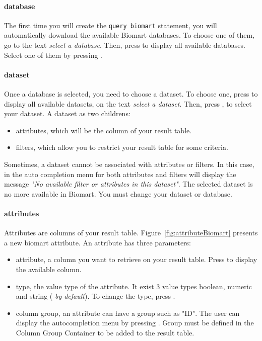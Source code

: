 \paragraph{database}
The first time you will create the \texttt{query biomart} statement, you will automatically download the available Biomart databases. To choose one of them, go to the text \textit{select a database}. Then, press \keys{\ctrl+\space} to display all available databases. Select one of them by pressing \keys{\return}. 

 
\paragraph{dataset} %
Once a database is selected, you need to choose a dataset. To choose one, press \keys{\ctrl+\space} to display all available datasets, on the text \textit{select a dataset}. Then, press \keys{\return}, to select your dataset. \newline
A dataset as two childrens:
\begin{itemize}
\item attributes, which will be the column of your result table.
\item filters, which allow you to restrict your result table for some criteria.
\end{itemize}
\begin{remark}
Sometimes, a dataset cannot be associated with attributes or filters. In this case, in the auto completion menu for both attributes and filters will display the message \textit{"No available filter or attributes in this dataset"}. The selected dataset is no more available in Biomart. You must change your dataset or database. 
\end{remark}

\paragraph{attributes}
Attributes are columns of your result table. Figure~\ref{fig:attributeBiomart} presents a new biomart attribute. An attribute has three parameters:
\begin{itemize}
\item attribute, a column you want to retrieve on your result table. Press \keys{\ctrl+\space} to display the available column.
\item type, the value type of the attribute. It exist 3  value types
boolean, numeric and string (\textit{ by default}). To change the type, press \keys{\ctrl+\space}.
\item column group, an attribute can have a group such as "ID". The user can display the autocompletion menu by pressing \keys{\ctrl+\space}. Group must be defined in the Column Group Container to be added to the result table.
\end{itemize}

